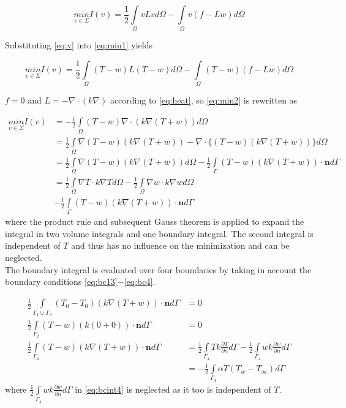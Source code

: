 \documentclass[10pt,a4paper]{article}
\begin{document}
\begin{equation}\label{eq:min1}
\underset{v\in\Sigma} {min}I(v) = \frac{1}{2}\underset{\Omega}{\int}vLvd\Omega-\underset{\Omega}{\int}v(f-Lw)d\Omega
\end{equation}

Substituting \eqref{eq:v} into \eqref{eq:min1} yields

\begin{equation}\label{eq:min2}
\underset{v\in\Sigma} {min}I(v) = \frac{1}{2}\underset{\Omega}{\int}(T-w)L(T-w)d\Omega-\underset{\Omega}{\int}(T-w)(f-Lw)d\Omega
\end{equation}

$f=0$ and $L = -\nabla\cdot( k\nabla)$ according to \eqref{eq:heat}, so \eqref{eq:min2} is rewritten as

\begin{equation}\label{eq:min3}
	\begin{split}
	\underset{v\in\Sigma} {min}I(v) & = -\frac{1}{2}\underset{\Omega}{\int}(T-w)\nabla\cdot(k\nabla(T+w))d\Omega\\
	&=\frac{1}{2}\underset{\Omega}{\int}\nabla (T-w)(k\nabla(T+w))-\nabla\cdot\{(T-w)(k\nabla(T+w))\}d\Omega\\
	&=\frac{1}{2}\underset{\Omega}{\int}\nabla (T-w)(k\nabla(T+w))d\Omega - \frac{1}{2}\underset{\Gamma}{\int}(T-w)(k\nabla(T+w))\cdot\textbf{\^{n}} d\Gamma\\
	&=\frac{1}{2}\underset{\Omega}{\int}\nabla T\cdot k \nabla T d\Omega - \frac{1}{2}\underset{\Omega}{\int}\nabla w\cdot k \nabla w d\Omega\\  &-\frac{1}{2}\underset{\Gamma}{\int}(T-w)(k\nabla(T+w))\cdot\textbf{\^{n}} d\Gamma
	\end{split}
\end{equation}
where the product rule and subsequent Gauss theorem is applied to expand the integral in two volume integrals and one boundary integral. The second integral is independent of $T$ and thus has no influence on the minimization and can be neglected. \\

The boundary integral is evaluated over four boundaries by taking in account the boundary conditions \eqref{eq:bc13}$-$\eqref{eq:bc4}. 

\begin{align}\label{eq:bcint13}
	\frac{1}{2}\underset{\Gamma_1\cup\Gamma_3}{\int}(T_0-T_0)(k\nabla(T+w))\cdot\textbf{\^{n}} d\Gamma &= 0\\
	\frac{1}{2}\underset{\Gamma_2}{\int}(T-w)(k(0+0))\cdot\textbf{\^{n}} d\Gamma & = 0\label{eq:bcint2}\\ 
	\frac{1}{2}\underset{\Gamma_4}{\int}(T-w)(k\nabla(T+w))\cdot\textbf{\^{n}} d\Gamma & = \frac{1}{2}\underset{\Gamma_4}{\int}Tk\frac{\partial T}{\partial n}d\Gamma - \frac{1}{2}\underset{\Gamma_4}{\int}wk\frac{\partial w}{\partial n}d\Gamma\nonumber\\
	&=-\frac{1}{2}\underset{\Gamma_4}{\int}\alpha T(T_w-T_{\infty})d\Gamma \label{eq:bcint4}
\end{align}
where $\frac{1}{2}\underset{\Gamma_4}{\int}wk\frac{\partial w}{\partial n}d\Gamma$ in \eqref{eq:bcint4} is neglected as it too is independent of $T$.\\
\end{document}
